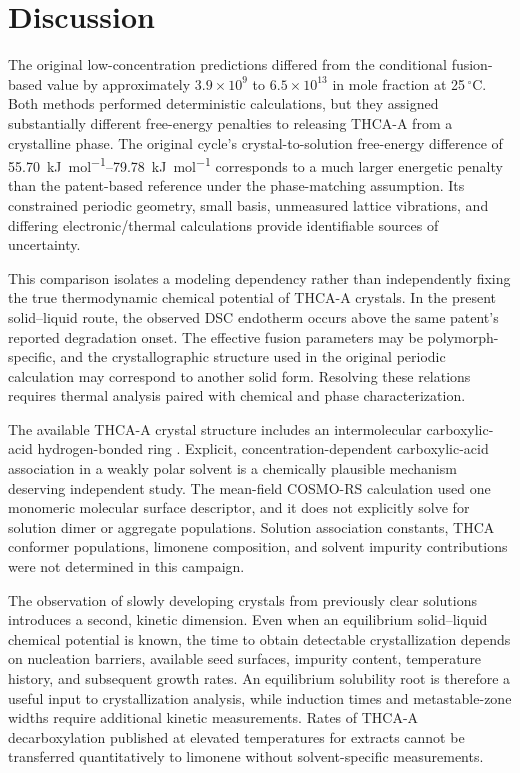\documentclass[10pt,a4paper,twocolumn]{article}
\begin{document}
\section{Discussion}\label{sec:discussion}
The original low-concentration predictions differed from the conditional fusion-based value by approximately $3.9\times10^9$ to $6.5\times10^{13}$ in mole fraction at 25\,$^\circ$C. Both methods performed deterministic calculations, but they assigned substantially different free-energy penalties to releasing THCA-A from a crystalline phase. The original cycle's crystal-to-solution free-energy difference of \SIrange{55.70}{79.78}{kJ.mol^{-1}} corresponds to a much larger energetic penalty than the patent-based reference under the phase-matching assumption. Its constrained periodic geometry, small basis, unmeasured lattice vibrations, and differing electronic/thermal calculations provide identifiable sources of uncertainty.

This comparison isolates a modeling dependency rather than independently fixing the true thermodynamic chemical potential of THCA-A crystals. In the present solid--liquid route, the observed DSC endotherm occurs above the same patent's reported degradation onset. The effective fusion parameters may be polymorph-specific, and the crystallographic structure used in the original periodic calculation may correspond to another solid form. Resolving these relations requires thermal analysis paired with chemical and phase characterization.

The available THCA-A crystal structure includes an intermolecular carboxylic-acid hydrogen-bonded ring \cite{skell}. Explicit, concentration-dependent carboxylic-acid association in a weakly polar solvent is a chemically plausible mechanism deserving independent study. The mean-field COSMO-RS calculation used one monomeric molecular surface descriptor, and it does not explicitly solve for solution dimer or aggregate populations. Solution association constants, THCA conformer populations, limonene composition, and solvent impurity contributions were not determined in this campaign.

The observation of slowly developing crystals from previously clear solutions introduces a second, kinetic dimension. Even when an equilibrium solid–liquid chemical potential is known, the time to obtain detectable crystallization depends on nucleation barriers, available seed surfaces, impurity content, temperature history, and subsequent growth rates. An equilibrium solubility root is therefore a useful input to crystallization analysis, while induction times and metastable-zone widths require additional kinetic measurements. Rates of THCA-A decarboxylation published at elevated temperatures for extracts \cite{wang} cannot be transferred quantitatively to limonene without solvent-specific measurements.
\end{document}
